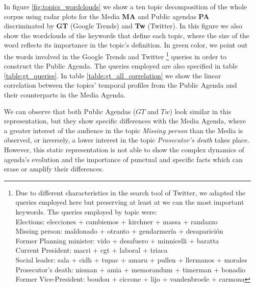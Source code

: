 \documentclass{bmcart}
\begin{document}
\par In figure \ref{fig:topics_wordclouds} we show a ten topic decomposition of the whole corpus using radar plots for the Media \textbf{MA} and Public agendas \textbf{PA} discriminated by \textbf{GT} (Google Trends) and \textbf{Tw} (Twitter). In this figure we also show the wordclouds of the keywords that define each topic, where the size of the word reflects its importance in the topic's definition. In green color, we point out the words involved in the Google Trends and Twitter  \footnote{Due to different characteristics in the search tool of Twitter, we adapted the queries employed here but preserving at least at we can the most important keywords. The queries employed by topic were: \\
Elections: elecciones + cambiemos + kirchner + massa + randazzo \\
Missing person: maldonado + otranto + gendarmer\'ia + desaparici\'on \\
Former Planning minister: vido + desafuero + minnicelli + baratta \\
Current President: macri + cgt + laboral +  triaca \\
Social leader:  sala + cidh + tupac + amaru + pullen + llermanos + morales \\
Prosecutor’s death: nisman + amia + memorandum + timerman +  bonadio \\
Former Vice-President:  boudou + ciccone +  lijo + vandenbroele + carmona
} queries in order to construct the Public Agenda. The queries employed are also specified in table \ref{table:gt_queries}. In table \ref{table:gt_all_correlation} we show the linear correlation between the topics' temporal profiles from the Public Agenda and their counterparts in the Media Agenda.

\par We can observe that both Public Agendas ($GT$ and $Tw$) look similar in this representation, but they show specific differences with the Media Agenda, where a greater interest of the audience in the topic \emph{Missing person} than the Media is observed, or inversely, a lower interest in the topic \emph{Prosecutor's death} takes place. However, this static representation is not able to show the complex dynamics of agenda's evolution and the importance of punctual and specific facts which can erase or amplify their differences. 
\end{document}
